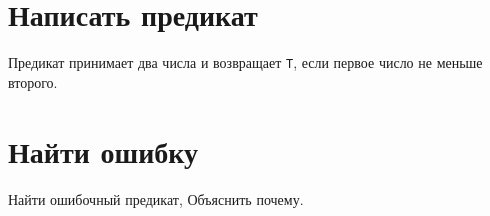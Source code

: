 \section{Написать предикат}

\problem
Предикат принимает два числа и возвращает \verb|T|, если первое число не меньше второго.




\section{Найти ошибку}

\problem Найти ошибочный предикат, Объяснить почему.

